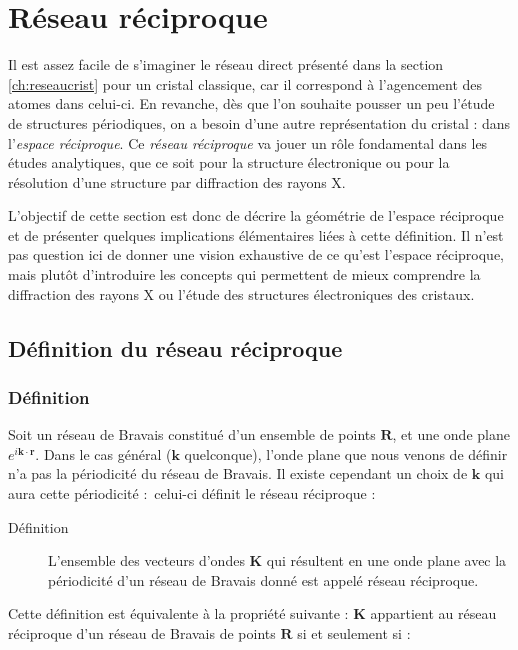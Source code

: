 \chapter{Réseau réciproque}
\label{ch:reseaurec}


Il est assez facile de s'imaginer le réseau direct présenté dans la section \ref{ch:reseaucrist} pour un cristal classique, car il correspond à l'agencement des atomes dans celui-ci. En revanche, dès que l'on souhaite pousser un peu l'étude de structures périodiques, on a besoin d'une autre représentation du cristal : dans l'\emph{espace réciproque}. Ce \emph{réseau réciproque} va jouer un rôle fondamental dans les études analytiques, que ce soit pour la structure électronique ou pour la résolution d'une structure par diffraction des rayons X.

L'objectif de cette section est donc de décrire la géométrie de l'espace réciproque et de présenter quelques implications élémentaires liées à cette définition. Il n'est pas question ici de donner une vision exhaustive de ce qu'est l'espace réciproque, mais plutôt d'introduire les concepts qui permettent de mieux comprendre la diffraction des rayons X ou l'étude des structures électroniques des cristaux.

\section{Définition du réseau réciproque}

\subsection{Définition}

Soit un réseau de Bravais constitué d'un ensemble de points $\mathbf{R}$, et une
onde plane $e^{i\mathbf{k}\cdot\mathbf{r}}$. Dans le cas général ($\mathbf{k}$ quelconque), l'onde plane que nous venons de définir n'a pas la périodicité du réseau de Bravais. Il existe cependant un choix de $\mathbf{k}$ qui aura cette périodicité : celui-ci définit le réseau réciproque :

\begin{description}
\item[Définition] L'ensemble des vecteurs d'ondes $\mathbf{K}$ qui résultent en une onde plane avec la périodicité d'un réseau de Bravais donné est appelé réseau réciproque.
\end{description}

Cette définition est équivalente à la propriété suivante : $\mathbf{K}$ appartient au réseau réciproque d'un réseau
de Bravais de points $\mathbf{R}$ si et seulement si :

